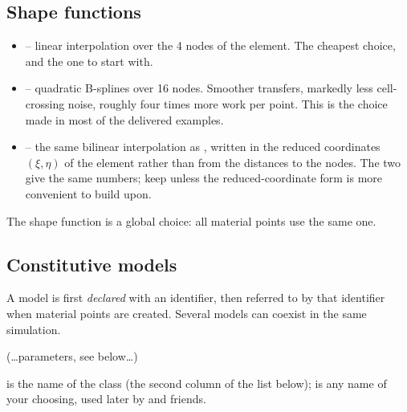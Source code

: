 \documentclass[a4paper,onecolumn,11pt]{doofus}
\newcommand{\syntaxml}[1]{%
  \par\noindent
  \colorbox{backcolour}{%
    \parbox{\dimexpr\linewidth-2\fboxsep-2\fboxrule\relax}{%
      \ttfamily\small\raggedright #1}}%
  \par
}
\newenvironment{codeblock}
  {\par\vspace{0.75em}}
  {\par\vspace{0.75em}}
\begin{document}
\subsection{Shape functions}
\label{sec:shapefunctions}

\begin{codeblock}
\end{codeblock}

\begin{itemize}
\item {} -- linear interpolation over the 4 nodes of the element.
      The cheapest choice, and the one to start with.
\item {} -- quadratic B-splines over 16 nodes. Smoother transfers, markedly less
      cell-crossing noise, roughly four times more work per point. This is the choice made in
      most of the delivered examples.
\item {} -- the same bilinear interpolation as ,
      written in the reduced coordinates $(\xi,\eta)$ of the element rather than from the
      distances to the nodes. The two give the same numbers; keep 
      unless the reduced-coordinate form is more convenient to build upon.
\end{itemize}

The shape function is a global choice: all material points use the same one.

\subsection{Constitutive models}
\label{sec:models}

A model is first \emph{declared} with an identifier, then referred to by that identifier when
material points are created. Several models can coexist in the same simulation.

\begin{codeblock}
\syntaxml{  \type{(string)}\param{modelIdentifier} (\dots parameters, see below\dots)}
\end{codeblock}

 is the name of the class (the second column of the list below);
 is any name of your choosing, used later by  and
friends.
\end{document}
